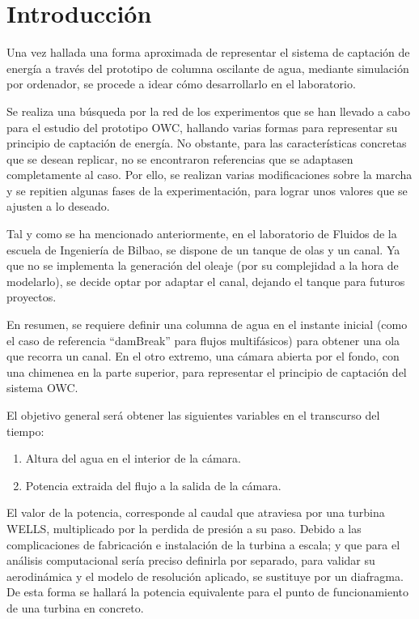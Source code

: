 \label{ch:experim}

\section{Introducción}\label{header-n0}

Una vez hallada una forma aproximada de representar el sistema de
captación de energía a través del prototipo de columna oscilante de
agua, mediante simulación por ordenador, se procede a idear cómo
desarrollarlo en el laboratorio.

Se realiza una búsqueda por la red de los experimentos que se han
llevado a cabo para el estudio del prototipo OWC, hallando varias formas
para representar su principio de captación de energía. No obstante, para
las características concretas que se desean replicar, no se encontraron
referencias que se adaptasen completamente al caso. Por ello, se
realizan varias modificaciones sobre la marcha y se repitien algunas
fases de la experimentación, para lograr unos valores que se ajusten a
lo deseado.

Tal y como se ha mencionado anteriormente, en el laboratorio de Fluidos
de la escuela de Ingeniería de Bilbao, se dispone de un tanque de olas y
un canal. Ya que no se implementa la generación del oleaje (por su
complejidad a la hora de modelarlo), se decide optar por adaptar el
canal, dejando el tanque para futuros proyectos.

En resumen, se requiere definir una columna de agua en el instante
inicial (como el caso de referencia ``damBreak'' para flujos multifásicos)
para obtener una ola que recorra un canal. En el otro extremo, una
cámara abierta por el fondo, con una chimenea en la parte superior, para
representar el principio de captación del sistema OWC.

El objetivo general será obtener las siguientes variables en el
transcurso del tiempo:

\begin{enumerate}
\def\labelenumi{\arabic{enumi}.}
\item
  Altura del agua en el interior de la cámara.
\item
  Potencia extraida del flujo a la salida de la cámara.
\end{enumerate}

El valor de la potencia, corresponde al caudal que atraviesa por una
turbina WELLS, multiplicado por la perdida de presión a su paso. Debido
a las complicaciones de fabricación e instalación de la turbina a
escala; y que para el análisis computacional sería preciso definirla por
separado, para validar su aerodinámica y el modelo de resolución
aplicado, se sustituye por un diafragma. De esta forma se hallará la
potencia equivalente para el punto de funcionamiento de una turbina en
concreto.

